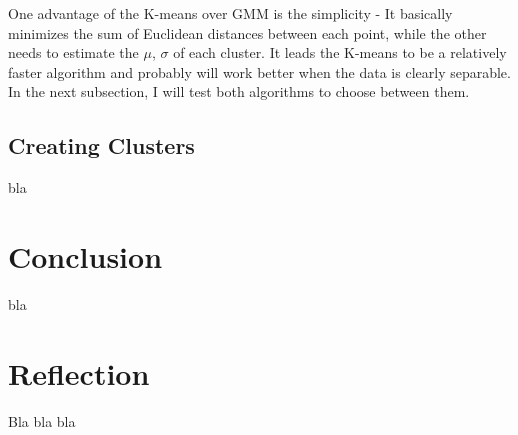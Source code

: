 \documentclass[a4paper]{article}
\begin{document}
One advantage of the K-means over GMM is the simplicity -  It basically minimizes the sum of Euclidean distances between each point, while the other needs to estimate the $\mu$, $\sigma$ of each cluster. It leads the K-means to be a relatively faster algorithm and probably will work better when the data is clearly separable. In the next subsection, I will test both algorithms to choose between them.

\subsection{Creating Clusters}

bla


\section{Conclusion}
\label{sec:conclusion}
bla


\section{Reflection}
\label{sec:reflection}
Bla bla bla






\end{document}
